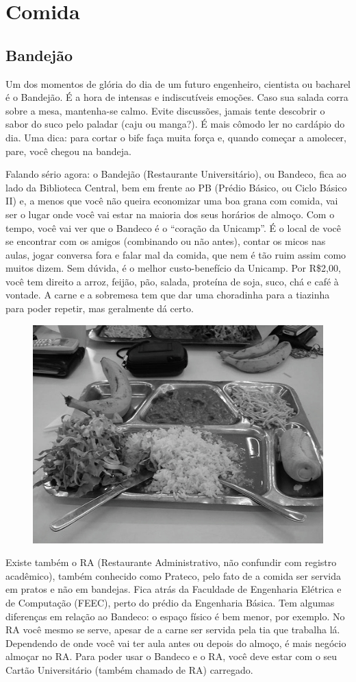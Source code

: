
\section{Comida}
\subsection{Bandejão}

Um dos momentos de glória do dia de um futuro engenheiro, cientista ou bacharel
é o Bandejão. É a hora de intensas e indiscutíveis emoções. Caso sua salada
corra sobre a mesa, mantenha-se calmo. Evite discussões, jamais tente descobrir
o sabor do suco pelo paladar (caju ou manga?). É mais cômodo ler no cardápio do
dia. Uma dica: para cortar o bife faça muita força e, quando começar a amolecer,
pare, você chegou na bandeja.

Falando sério agora: o Bandejão (Restaurante Universitário), ou Bandeco,
fica ao lado da Biblioteca Central, bem em frente ao PB (Prédio Básico, ou Ciclo
Básico II) e, a menos que você não queira economizar uma boa grana com comida,
vai ser o lugar onde você vai estar na maioria dos seus horários de almoço. Com
o tempo, você vai ver que o Bandeco é o ``coração da Unicamp''. É o local de
você se encontrar com os amigos (combinando ou não antes), contar os micos nas
aulas, jogar conversa fora e falar mal da comida, que nem é tão ruim assim como
muitos dizem. Sem dúvida, é o melhor custo-benefício da Unicamp. Por R\$2,00,
você tem direito a arroz, feijão, pão, salada, proteína de soja, suco, chá e café à
vontade. A carne e a sobremesa tem que dar uma choradinha para a tiazinha para
poder repetir, mas geralmente dá certo.

\begin{figure}[h!]
    \centering
    \includegraphics[width=.45\textwidth]{img/barao/bandeco.jpg}
\end{figure}

Existe também o RA (Restaurante Administrativo, não confundir com registro acadêmico), também conhecido como Prateco,
pelo fato de a comida ser servida em pratos e não em bandejas. Fica atrás da
Faculdade de Engenharia Elétrica e de Computação (FEEC), perto do prédio da
Engenharia Básica. Tem algumas diferenças em relação ao Bandeco: o espaço físico
é bem menor, por exemplo. No RA você mesmo se serve, apesar de a carne
ser servida pela tia que trabalha lá. Dependendo
de onde você vai ter aula antes ou depois do almoço, é mais negócio almoçar no
RA. Para poder usar o Bandeco e o RA, você deve estar com o seu Cartão
Universitário (também chamado de RA) carregado.

